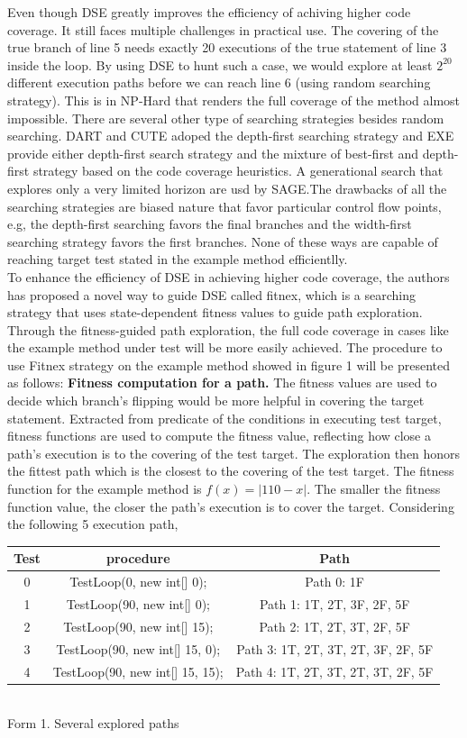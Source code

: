\indent Even though DSE greatly improves the efficiency of achiving higher code coverage. It still faces multiple challenges in practical use. The covering of the true branch of line 5 needs exactly 20 executions of the true statement of line 3 inside the loop. By using DSE to hunt such a case, we would explore at least $2^{20}$ different execution paths before we can reach line 6 (using random searching strategy). This is in NP-Hard that renders the full coverage of the method almost impossible. 
\indent There are several other type of searching strategies besides random searching. DART and CUTE adoped the depth-first searching strategy and EXE provide either depth-first search strategy and the mixture of best-first and depth-first strategy based on the code coverage heuristics. A generational search that explores only a very limited horizon are usd by SAGE.The drawbacks of all the searching strategies are biased nature that favor particular control flow points, e.g, the depth-first searching favors the final branches and the width-first searching strategy favors the first branches. None of these ways are capable of reaching target test stated in the example method efficientlly.\\
\indent To enhance the efficiency of DSE in achieving higher code coverage, the authors has proposed a novel way to guide DSE called fitnex, which is a searching strategy that uses state-dependent fitness values to guide path exploration. Through the fitness-guided path exploration, the full code coverage in cases like the example method under test will be more easily achieved. The procedure to use Fitnex strategy on the example method showed in figure 1 will be presented as follows:
\indent \textbf{Fitness computation for a path.} The fitness values are used to decide which branch's flipping would be more helpful in covering the target statement. Extracted from predicate of the conditions in executing test target, fitness functions are used to compute the fitness value, reflecting how close a path's execution is to the covering of the test target. The exploration then honors the fittest path which is the closest to the covering of the test target. The fitness function for the example method is $f(x)=|110-x|$. The smaller the fitness function value, the closer the path's execution is to cover the target. Considering the following 5 execution path,\\ 
\begin{center}
\begin{tabular}{|c|c|c|}\hline
Test & procedure & Path \\\hline
0 & TestLoop(0, new int[] {0}); & Path 0: 1F\\\hline
1 & TestLoop(90, new int[] {0}); & Path 1: 1T, 2T, 3F, 2F, 5F\\\hline
2 & TestLoop(90, new int[] {15}); &Path 2: 1T, 2T, 3T, 2F, 5F\\\hline
3 & TestLoop(90, new int[] {15, 0}); & Path 3: 1T, 2T, 3T, 2T, 3F, 2F, 5F\\\hline
4 & TestLoop(90, new int[] {15, 15});& Path 4: 1T, 2T, 3T, 2T, 3T, 2F, 5F\\\hline
\end{tabular}\\
Form 1. Several explored paths
\end{center}

